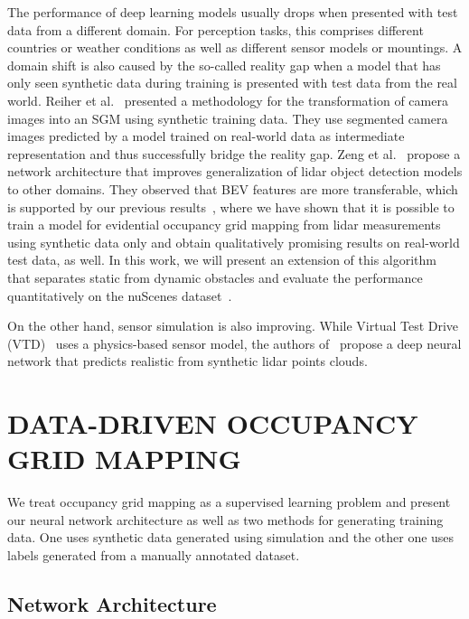 \documentclass[conference]{IEEEtran}
\begin{document}
The performance of deep learning models usually drops when presented with test data from a different domain. For perception tasks, this comprises different countries or weather conditions as well as different sensor models or mountings. A domain shift is also caused by the so-called reality gap when a model that has only seen synthetic data during training is presented with test data from the real world. Reiher et al.~\cite{Reiher.2020} presented a methodology for the transformation of camera images into an SGM using synthetic training data. They use segmented camera images predicted by a model trained on real-world data as intermediate representation and thus successfully bridge the reality gap. Zeng et al.~\cite{.2021f} propose a network architecture that improves generalization of lidar object detection models to other domains. They observed that BEV features are more transferable, which is supported by our previous results~\cite{vanKempen.2021b}, where we have shown that it is possible to train a model for evidential occupancy grid mapping from lidar measurements using synthetic data only and obtain qualitatively promising results on real-world test data, as well. In this work, we will present an extension of this algorithm that separates static from dynamic obstacles and evaluate the performance quantitatively on the nuScenes dataset~\cite{Caesar.2020}.

On the other hand, sensor simulation is also improving. While Virtual Test Drive (VTD)~\cite{VirtualTestDrive.2022} uses a physics-based sensor model, the authors of~\cite{Manivasagam.2020} propose a deep neural network that predicts realistic from synthetic lidar points clouds.


\section{DATA-DRIVEN OCCUPANCY GRID MAPPING}

We treat occupancy grid mapping as a supervised learning problem and present our neural network architecture as well as two methods for generating training data. One uses synthetic data generated using simulation and the other one uses labels generated from a manually annotated dataset.


\subsection{Network Architecture}
\end{document}
